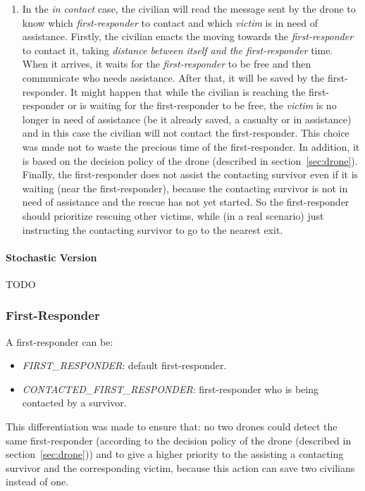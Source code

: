 \begin{enumerate}
\begin{enumerate}
		\item In the \textit{in contact} case, the civilian will read the message sent by the drone to know which \textit{first-responder} to contact and which \textit{victim} is in need of assistance. Firstly, the civilian enacts the moving towards the \textit{first-responder} to contact it, taking \textit{distance between itself and the first-responder} time. When it arrives, it waits for the \textit{first-responder} to be free and then communicate who needs assistance. After that, it will be saved by the first-responder.\newline
		It might happen that while the civilian is reaching the first-responder or is waiting for the first-responder to be free, the \textit{victim} is no longer in need of assistance (be it already saved, a casualty or in assistance) and in this case the civilian will not contact the first-responder. This choice was made not to waste the precious time of the first-responder. In addition, it is based on the decision policy of the drone (described in section~\ref{sec:drone}). Finally, the first-responder does not assist the contacting survivor even if it is waiting (near the first-responder), because the contacting survivor is not in need of assistance and the rescue has not yet started. So the first-responder should prioritize rescuing other victims, while (in a real scenario) just instructing the contacting survivor to go to the nearest exit.
	\end{enumerate}
\end{enumerate}


\paragraph{Stochastic Version}
TODO

\subsubsection{First-Responder}
A first-responder can be:
\begin{itemize}
	\item \textit{FIRST\_RESPONDER}: default first-responder.
	\item \textit{CONTACTED\_FIRST\_RESPONDER}: first-responder who is being contacted by a survivor.
\end{itemize}

\noindent
This differentiation was made to ensure that: no two drones could detect the same first-responder (according to the decision policy of the drone (described in section~\ref{sec:drone})) and to give a higher priority to the assisting a contacting survivor and the corresponding victim, because this action can save two civilians instead of one.\newline

